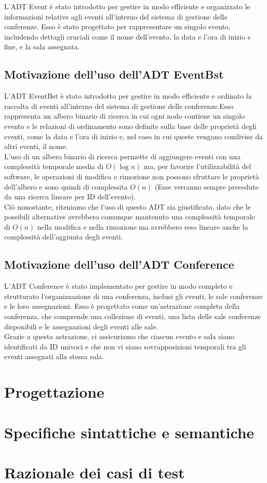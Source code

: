 \documentclass[11pt]{scrartcl} %
\begin{document}
L'ADT Event è stato introdotto per gestire in modo efficiente e organizzato le informazioni relative agli eventi all'interno del sistema di gestione delle conferenze. Esso è stato progettato per rappresentare un singolo evento, includendo dettagli cruciali come il nome dell'evento, la data e l'ora di inizio e fine, e la sala assegnata.

\subsection{Motivazione dell'uso dell'ADT EventBst}

L'ADT EventBst è stato introdotto per gestire in modo efficiente e ordinato la raccolta di eventi all'interno del sistema di gestione delle conferenze.Esso rappresenta un albero binario di ricerca in cui ogni nodo contiene un singolo evento e le relazioni di ordinamento sono definite sulla base delle proprietà degli eventi, come la data e l'ora di inizio e, nel caso in cui queste vengano condivise da altri eventi, il nome.\\
L'uso di un albero binario di ricerca permette di aggiungere eventi con una complessità temporale media di $O(\log{n})$ ma, per favorire l'utilizzabilità del software, le operazioni di modifica e rimozione non possono sfruttare le proprietà dell'albero e sono quindi di complessita $O(n)$ (Esse verranno sempre precedute da una ricerca lineare per ID dell'evento).\\
Ciò nonostante, riteniamo che l'uso di questo ADT sia giustificato, dato che le possibili alternative avrebbero comunque mantenuto una complessità temporale di $O(n)$ nella modifica e nella rimozione ma avrebbero reso lineare anche la complessità dell'aggiunta degli eventi.

\subsection{Motivazione dell'uso dell'ADT Conference}

L'ADT Conference è stato implementato per gestire in modo completo e strutturato l'organizzazione di una conferenza, inclusi gli eventi, le sale conferenze e le loro assegnazioni. Esso è progettato come un'astrazione completa della conferenza, che comprende una collezione di eventi, una lista delle sale conferenze disponibili e le assegnazioni degli eventi alle sale.\\
Grazie a questa astrazione, ci assicuriamo che ciascun evento e sala siano identificati da ID univoci e che non vi siano sovrapposizioni temporali tra gli eventi assegnati alla stessa sala.


\section{Progettazione}
\section{Specifiche sintattiche e semantiche}
\section{Razionale dei casi di test}
\end{document}
